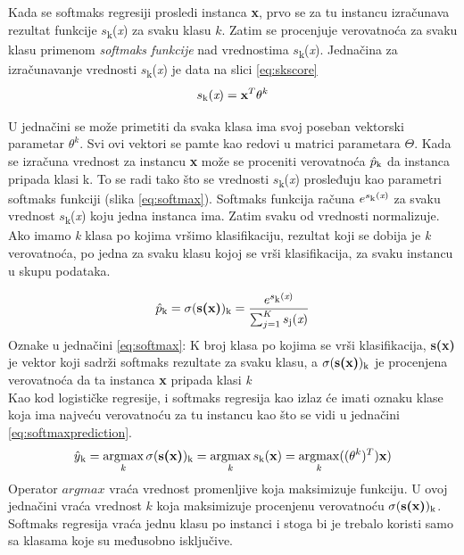 \documentclass[a4paper,12pt]{report}
\DeclareMathOperator*{\argmax}{argmax}
\begin{document}
Kada se softmaks regresiji prosledi instanca \textbf{x}, prvo se za tu instancu izračunava rezultat funkcije $s$\textsubscript{k}(\textit{x}) za svaku klasu $k$. Zatim se procenjuje verovatnoća za svaku klasu primenom \textit{softmaks funkcije} nad vrednostima $s$\textsubscript{k}(\textit{x}). Jednačina za izračunavanje vrednosti $s$\textsubscript{k}(\textit{x}) je data na slici \ref{eq:skscore}
\begin{equation} \label{eq:skscore}
	 s\textsubscript{k}(\textit{x}) =  \textbf{x}^T\theta^{k}
\end{equation}

U jednačini se može primetiti da svaka klasa ima svoj poseban vektorski parametar $\theta^{k}$. Svi ovi vektori se pamte kao redovi u matrici parametara $\Theta$. Kada se izračuna vrednost za instancu \textbf{x} može se proceniti verovatnoća $\hat{p}\textsubscript{k}$ da instanca pripada klasi k. To se radi tako što se vrednosti $s$\textsubscript{k}(\textit{x}) prosleđuju kao parametri softmaks funkciji (slika \ref{eq:softmax}). Softmaks funkcija računa $e^{s\textsubscript{k}(\textit{x})}$ za svaku vrednost $s$\textsubscript{k}(\textit{x}) koju jedna instanca ima. Zatim svaku od vrednosti normalizuje. Ako imamo \textit{k} klasa po kojima vršimo klasifikaciju, rezultat koji se dobija je \textit{k} verovatnoća, po jedna za svaku klasu kojoj se vrši klasifikacija, za svaku instancu u skupu podataka. 

\begin{equation} \label{eq:softmax}
	\hat{p}\textsubscript{k} = \sigma(\textbf{s(x)})\textsubscript{k} =  \frac{e^{s\textsubscript{k}(\textit{x})}}{\sum_{j = 1}^{K} s\textsubscript{j}(\textit{x})}
\end{equation}
Oznake u jednačini \ref{eq:softmax}: K broj klasa po kojima se vrši klasifikacija, \textbf{s(x)} je vektor koji sadrži softmaks rezultate za svaku klasu, a $\sigma(\textbf{s(x)})\textsubscript{k}$ je procenjena verovatnoća da ta instanca \textbf{x} pripada klasi \textit{k}\\

Kao kod logističke regresije, i softmaks regresija kao izlaz će imati oznaku klase koja ima najveću verovatnoću za tu instancu kao što se vidi u jednačini \ref{eq:softmaxprediction}.
\begin{equation} \label{eq:softmaxprediction}
	\hat{y}\textsubscript{k} = \argmax_k \sigma(\textbf{s(x)})\textsubscript{k} = \argmax_k s\textsubscript{k}(\textbf{x}) = \argmax_k ((\theta^{k})^T)\textbf{x})
\end{equation}
Operator $argmax$ vraća vrednost promenljive koja maksimizuje funkciju. U ovoj jednačini vraća vrednost $k$ koja maksimizuje procenjenu verovatnoću $\sigma(\textbf{s(x)})\textsubscript{k}$. Softmaks regresija vraća jednu klasu po instanci i stoga bi je trebalo koristi samo sa klasama koje su međusobno isključive. \\
\end{document}
